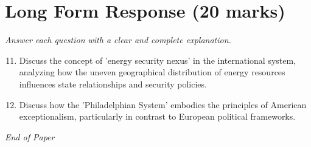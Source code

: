 \documentclass[12pt]{article}
\begin{document}
\section*{Long Form Response (20 marks)}
\textit{Answer each question with a clear and complete explanation.}
\begin{enumerate}[label=\arabic*.]
\setcounter{enumi}{10}
\item Discuss the concept of 'energy security nexus' in the international system, analyzing how the uneven geographical distribution of energy resources influences state relationships and security policies.
\item Discuss how the 'Philadelphian System' embodies the principles of American exceptionalism, particularly in contrast to European political frameworks.
\end{enumerate}

\vfill
\noindent\textit{End of Paper}
\end{document}
